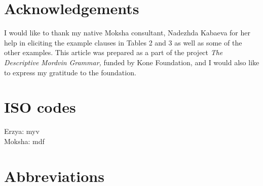 \documentclass[output=paper]{langsci/langscibook}
\begin{document}
\nocite{Moksha1998-1,PaasonenRavila1947}
{\sloppy
\printbibliography[heading=subbibliography,notkeyword=this,category=sources,title={Sources}]
}

\section*{Acknowledgements}
I would like to thank my native Moksha consultant, Nadezhda Kabaeva for her help in eliciting the example clauses in Tables 2 and 3 as well as some of the other examples. This article was prepared as a part of the project \textit{The} \textit{Descriptive} \textit{Mordvin} \textit{Grammar,} funded by Kone Foundation, and I would also like to express my gratitude to the foundation.

\section*{ISO codes}
Erzya: myv\\
Moksha: mdf

\section*{Abbreviations}
\end{document}
